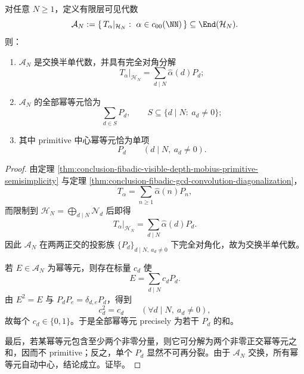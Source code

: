 \begin{theorem}\label{thm:conclusion-fibadic-finite-layer-gcd-primitive-central-idempotents}
对任意 \(N\ge 1\)，定义有限层可见代数
\[
\mathcal A_N:=\{\,T_\alpha|_{\mathcal H_N}:\ \alpha\in c_{00}(\NN)\,\}
\subseteq \End(\mathcal H_N).
\]
则：
\begin{enumerate}
\item \(\mathcal A_N\) 是交换半单代数，并具有完全对角分解
\[
T_\alpha|_{\mathcal H_N}
=
\sum_{d\mid N}\widehat\alpha(d)P_d;
\]
\item \(\mathcal A_N\) 的全部幂等元恰为
\[
\sum_{d\in S}P_d,
\qquad
S\subseteq \{d\mid N:\ a_d\neq 0\};
\]
\item 其中 primitive 中心幂等元恰为单项
\[
P_d
\qquad
(d\mid N,\ a_d\neq 0).
\]
\end{enumerate}
\end{theorem}
\begin{proof}
由定理 \ref{thm:conclusion-fibadic-visible-depth-mobius-primitive-semisimplicity} 与定理 \ref{thm:conclusion-fibadic-gcd-convolution-diagonalization}，
\[
T_\alpha=\sum_{n\ge 1}\widehat\alpha(n)P_n,
\]
而限制到 \(\mathcal H_N=\bigoplus_{d\mid N}\mathcal N_d\) 后即得
\[
T_\alpha|_{\mathcal H_N}
=
\sum_{d\mid N}\widehat\alpha(d)P_d.
\]
因此 \(\mathcal A_N\) 在两两正交的投影族 \(\{P_d\}_{d\mid N,\ a_d\neq 0}\) 下完全对角化，故为交换半单代数。

若 \(E\in\mathcal A_N\) 为幂等元，则存在标量 \(c_d\) 使
\[
E=\sum_{d\mid N}c_dP_d.
\]
由 \(E^2=E\) 与 \(P_dP_e=\delta_{d,e}P_d\)，得到
\[
c_d^2=c_d
\qquad
(\forall d\mid N,\ a_d\neq 0),
\]
故每个 \(c_d\in\{0,1\}\)。于是全部幂等元 precisely 为若干 \(P_d\) 的和。

最后，若某幂等元包含至少两个非零分量，则它可分解为两个非零正交幂等元之和，因而不 primitive；反之，单个 \(P_d\) 显然不可再分裂。由于 \(\mathcal A_N\) 交换，所有幂等元自动中心，结论成立。证毕。
\end{proof}

